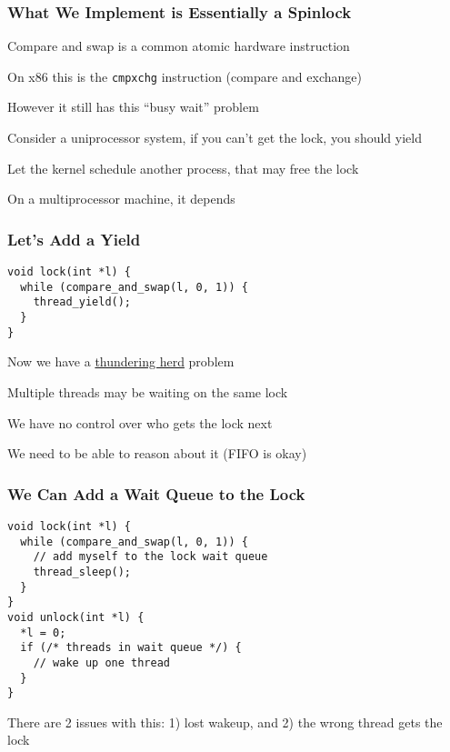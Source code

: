   \begin{frame}
    \frametitle{What We Implement is Essentially a Spinlock}

    Compare and swap is a common atomic hardware instruction

    \vspace{2em}

    On x86 this is the \texttt{cmpxchg} instruction (compare and exchange)

    \vspace{2em}

    However it still has this ``busy wait'' problem

    \vspace{2em}

    Consider a uniprocessor system, if you can't get the lock, you should yield

    \hspace{2em} Let the kernel schedule another process, that may free the lock

    \vspace{2em}

    On a multiprocessor machine, it depends
  \end{frame}

  \begin{frame}[fragile]
    \frametitle{Let's Add a Yield}

    \begin{lstlisting}
void lock(int *l) {
  while (compare_and_swap(l, 0, 1)) {
    thread_yield();
  }
}
    \end{lstlisting}

    \vspace{2em}

    Now we have a 
    \href{https://en.wikipedia.org/wiki/Thundering_herd_problem}{thundering herd}
    problem

    \hspace{2em} Multiple threads may be waiting on the same lock

    \vspace{2em}

    We have no control over who gets the lock next

    \hspace{2em} We need to be able to reason about it (FIFO is okay)
  \end{frame}

  \begin{frame}[fragile]
    \frametitle{We Can Add a Wait Queue to the Lock}

    \begin{lstlisting}
void lock(int *l) {
  while (compare_and_swap(l, 0, 1)) {
    // add myself to the lock wait queue
    thread_sleep();
  }
}
void unlock(int *l) {
  *l = 0;
  if (/* threads in wait queue */) {
    // wake up one thread
  }
}
    \end{lstlisting}

    There are 2 issues with this: 1) lost wakeup, and 2) the wrong thread gets
    the lock
  \end{frame}

